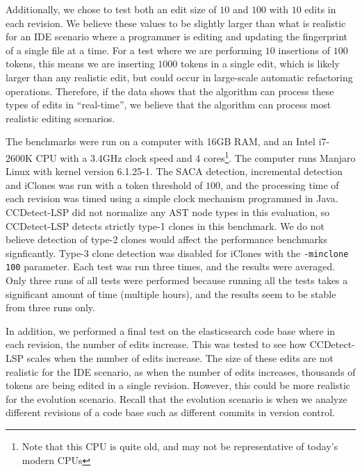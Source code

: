 Additionally, we chose to test both an edit size of $10$ and $100$ with $10$ edits in each
revision. We believe these values to be slightly larger than what is realistic for an IDE
scenario where a programmer is editing and updating the fingerprint of a single file at a
time. For a test where we are performing $10$ insertions of $100$ tokens, this means we
are inserting $1000$ tokens in a single edit, which is likely larger than any realistic
edit, but could occur in large-scale automatic refactoring operations. Therefore, if the
data shows that the algorithm can process these types of edits in ``real-time'', we believe
that the algorithm can process most realistic editing scenarios.

The benchmarks were run on a computer with 16GB RAM, and an Intel i7-2600K CPU with a
3.4GHz clock speed and 4 cores\footnote{Note that this CPU is quite old, and may not be
representative of today's modern CPUs}. The computer runs Manjaro Linux with kernel
version 6.1.25-1. The SACA detection, incremental detection and iClones was run with a
token threshold of $100$, and the processing time of each revision was timed using a
simple clock mechanism programmed in Java. CCDetect-LSP did not normalize any AST node
types in this evaluation, so CCDetect-LSP detects strictly type-1 clones in this
benchmark. We do not believe detection of type-2 clones would affect the performance
benchmarks signficantly. Type-3 clone detection was disabled for iClones with the
\verb|-minclone 100| parameter. Each test was run three times, and the results were
averaged. Only three runs of all tests were performed because running all the tests takes
a significant amount of time (multiple hours), and the results seem to be stable from
three runs only.

In addition, we performed a final test on the elasticsearch code base where in each
revision, the number of edits increase. This was tested to see how CCDetect-LSP scales
when the number of edits increase. The size of these edits are not realistic for the IDE
scenario, as when the number of edits increases, thousands of tokens are being edited in a
single revision. However, this could be more realistic for the evolution scenario. Recall
that the evolution scenario is when we analyze different revisions of a code base such as
different commits in version control.


